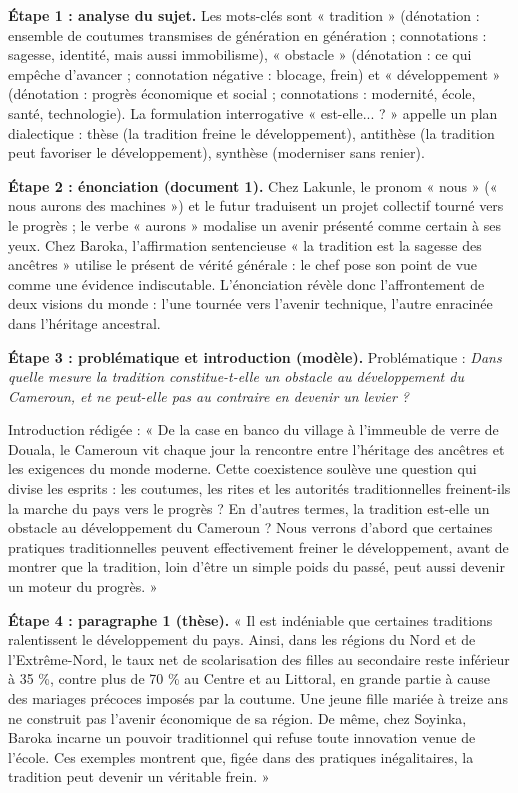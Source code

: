 \documentclass[11pt]{article}
\newcommand{\cle}[1]{{\popxbold\color{popdark}#1}}
\newcounter{popsec}
\newcounter{popsub}
\newcommand{\courssub}[1]{%
  \stepcounter{popsub}%
  \par\vspace{9pt}\noindent{\popxbold\fontsize{11.5}{13}\selectfont\color{popink}{\color{poporange}\thepopsec.\thepopsub}\hspace{6pt}#1}\par\nopagebreak\vspace{4pt}
}
\begin{document}
\courssub{Démarche et corrigé commenté}

\begin{exoresolu}
\textbf{Étape 1 : analyse du sujet.} Les mots-clés sont « tradition » (dénotation : ensemble de coutumes transmises de génération en génération ; connotations : sagesse, identité, mais aussi immobilisme), « obstacle » (dénotation : ce qui empêche d'avancer ; connotation négative : blocage, frein) et « développement » (dénotation : progrès économique et social ; connotations : modernité, école, santé, technologie). La formulation interrogative « est-elle... ? » appelle un \cle{plan dialectique} : thèse (la tradition freine le développement), antithèse (la tradition peut favoriser le développement), synthèse (moderniser sans renier).

\tcblower

\textbf{Étape 2 : énonciation (document 1).} Chez Lakunle, le pronom « nous » (« nous aurons des machines ») et le futur traduisent un projet collectif tourné vers le progrès ; le verbe « aurons » modalise un avenir présenté comme certain à ses yeux. Chez Baroka, l'affirmation sentencieuse « la tradition est la sagesse des ancêtres » utilise le présent de vérité générale : le chef pose son point de vue comme une évidence indiscutable. L'énonciation révèle donc l'affrontement de deux visions du monde : l'une tournée vers l'avenir technique, l'autre enracinée dans l'héritage ancestral.

\textbf{Étape 3 : problématique et introduction (modèle).} Problématique : \emph{Dans quelle mesure la tradition constitue-t-elle un obstacle au développement du Cameroun, et ne peut-elle pas au contraire en devenir un levier ?}

Introduction rédigée : « De la case en banco du village à l'immeuble de verre de Douala, le Cameroun vit chaque jour la rencontre entre l'héritage des ancêtres et les exigences du monde moderne. Cette coexistence soulève une question qui divise les esprits : les coutumes, les rites et les autorités traditionnelles freinent-ils la marche du pays vers le progrès ? En d'autres termes, la tradition est-elle un obstacle au développement du Cameroun ? Nous verrons d'abord que certaines pratiques traditionnelles peuvent effectivement freiner le développement, avant de montrer que la tradition, loin d'être un simple poids du passé, peut aussi devenir un moteur du progrès. »

\textbf{Étape 4 : paragraphe 1 (thèse).} « Il est indéniable que certaines traditions ralentissent le développement du pays. Ainsi, dans les régions du Nord et de l'Extrême-Nord, le taux net de scolarisation des filles au secondaire reste inférieur à 35 \%, contre plus de 70 \% au Centre et au Littoral, en grande partie à cause des mariages précoces imposés par la coutume. Une jeune fille mariée à treize ans ne construit pas l'avenir économique de sa région. De même, chez Soyinka, Baroka incarne un pouvoir traditionnel qui refuse toute innovation venue de l'école. Ces exemples montrent que, figée dans des pratiques inégalitaires, la tradition peut devenir un véritable frein. »


\end{exoresolu}
\end{document}

